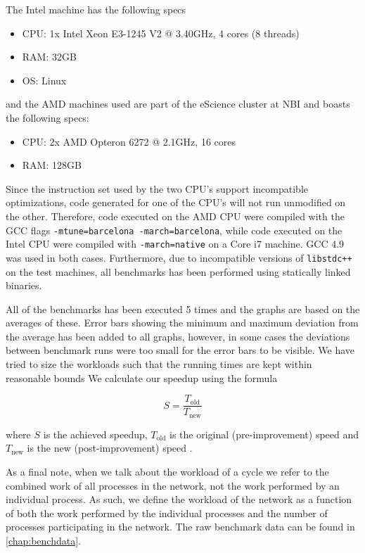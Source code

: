 The Intel machine has the following specs
\begin{itemize}
\item CPU: 1x Intel Xeon E3-1245 V2 @ 3.40GHz, 4 cores (8 threads)
\item RAM: 32GB
\item OS: Linux
\end{itemize}

and the AMD machines used are part of the eScience cluster at NBI and
boasts the following specs:
\begin{itemize}
  \item CPU: 2x AMD Opteron 6272 @ 2.1GHz, 16 cores
  \item RAM: 128GB
\end{itemize}

Since the instruction set used by the two CPU's support incompatible
optimizations, code generated for one of the CPU's will not run
unmodified on the other. Therefore, code executed on the AMD CPU were
compiled with the GCC flags \texttt{-mtune=barcelona
  -march=barcelona}, while code executed on the Intel CPU were
compiled with \texttt{-march=native} on a Core i7 machine. GCC 4.9 was
used in both cases. Furthermore, due to incompatible versions of
\texttt{libstdc++} on the test machines, all benchmarks has been
performed using statically linked binaries.

All of the benchmarks has been executed 5 times and the graphs are
based on the averages of these. Error bars showing the minimum and
maximum deviation from the average has been added to all graphs,
however, in some cases the deviations between benchmark runs were too small
for the error bars to be visible.
We have tried to size the workloads such that the running times are
kept within reasonable bounds 
We calculate our speedup using the formula


\begin{equation*}
S = \frac{T_{\text{old}}}{T_{\text{new}}}
\end{equation*}

where $S$ is the achieved speedup, $T_{\text{old}}$ is the original
(pre-improvement) speed and $T_{\text{new}}$ is the new
(post-improvement) speed \cite{hennessy2012computer}.

As a final note, when we talk about the workload of a cycle we refer
to the combined work of all processes in the network, not the work
performed by an individual process. As such, we define the workload of
the network as a function of both the work performed by the individual
processes and the number of processes participating in the
network. The raw benchmark data can be found in \cref{chap:benchdata}.

